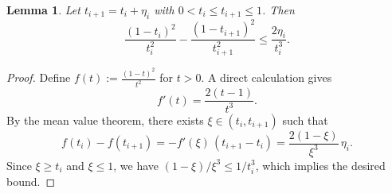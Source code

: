\documentclass{article}
\theoremstyle{plain}
\newtheorem{lemma}[theorem]{Lemma}
\theoremstyle{definition}
\theoremstyle{remark}
\begin{document}
\begin{lemma}
\label{lemma: simple identity 1}
Let $t_{i+1} = t_i + \eta_i$ with $0 < t_i \le t_{i+1} \le 1$. Then
\[
\frac{(1-t_i)^2}{t_i^2}
-
\frac{(1-t_{i+1})^2}{t_{i+1}^2}
\le
\frac{2\eta_i}{t_i^3}.
\]
\end{lemma}

\begin{proof}
Define $f(t) := \frac{(1-t)^2}{t^2}$ for $t > 0$. A direct calculation gives
\[
f'(t) = \frac{2(t-1)}{t^3}.
\]
By the mean value theorem, there exists $\xi \in (t_i, t_{i+1})$ such that
\[
f(t_i) - f(t_{i+1})
= -f'(\xi)\,(t_{i+1}-t_i)
= \frac{2(1-\xi)}{\xi^3}\,\eta_i.
\]
Since $\xi \ge t_i$ and $\xi \le 1$, we have
\(
(1-\xi)/\xi^3 \le 1/t_i^3
\),
which implies the desired bound.
\end{proof}


\end{document}
